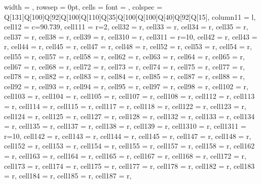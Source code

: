 \begin{longtblr}[
  caption = {Linear model estimating all the considered metrics in every alternative scenario.},
  label = {tab:appendix_LCBM_all_metrics_all_scenarios}
]{
  width = \linewidth,
  rowsep = 0pt,
  cells   = {font = \fontsize{6}{5}\selectfont},
  colspec = {Q[131]Q[100]Q[92]Q[100]Q[110]Q[35]Q[100]Q[100]Q[40]Q[92]Q[15]},
  column{11} = {l},
  cell{1}{2} = {c=9}{0.739\linewidth},
  cell{1}{11} = {r=2}{},
  cell{3}{2} = {r},
  cell{3}{3} = {r},
  cell{3}{4} = {r},
  cell{3}{5} = {r},
  cell{3}{7} = {r},
  cell{3}{8} = {r},
  cell{3}{9} = {r},
  cell{3}{10} = {r},
  cell{3}{11} = {r=10}{},
  cell{4}{2} = {r},
  cell{4}{3} = {r},
  cell{4}{4} = {r},
  cell{4}{5} = {r},
  cell{4}{7} = {r},
  cell{4}{8} = {r},
  cell{5}{2} = {r},
  cell{5}{3} = {r},
  cell{5}{4} = {r},
  cell{5}{5} = {r},
  cell{5}{7} = {r},
  cell{5}{8} = {r},
  cell{6}{2} = {r},
  cell{6}{3} = {r},
  cell{6}{4} = {r},
  cell{6}{5} = {r},
  cell{6}{7} = {r},
  cell{6}{8} = {r},
  cell{7}{2} = {r},
  cell{7}{3} = {r},
  cell{7}{4} = {r},
  cell{7}{5} = {r},
  cell{7}{7} = {r},
  cell{7}{8} = {r},
  cell{8}{2} = {r},
  cell{8}{3} = {r},
  cell{8}{4} = {r},
  cell{8}{5} = {r},
  cell{8}{7} = {r},
  cell{8}{8} = {r},
  cell{9}{2} = {r},
  cell{9}{3} = {r},
  cell{9}{4} = {r},
  cell{9}{5} = {r},
  cell{9}{7} = {r},
  cell{9}{8} = {r},
  cell{10}{2} = {r},
  cell{10}{3} = {r},
  cell{10}{4} = {r},
  cell{10}{5} = {r},
  cell{10}{7} = {r},
  cell{10}{8} = {r},
  cell{11}{2} = {r},
  cell{11}{3} = {r},
  cell{11}{4} = {r},
  cell{11}{5} = {r},
  cell{11}{7} = {r},
  cell{11}{8} = {r},
  cell{12}{2} = {r},
  cell{12}{3} = {r},
  cell{12}{4} = {r},
  cell{12}{5} = {r},
  cell{12}{7} = {r},
  cell{12}{8} = {r},
  cell{13}{2} = {r},
  cell{13}{3} = {r},
  cell{13}{4} = {r},
  cell{13}{5} = {r},
  cell{13}{7} = {r},
  cell{13}{8} = {r},
  cell{13}{9} = {r},
  cell{13}{10} = {r},
  cell{13}{11} = {r=10}{},
  cell{14}{2} = {r},
  cell{14}{3} = {r},
  cell{14}{4} = {r},
  cell{14}{5} = {r},
  cell{14}{7} = {r},
  cell{14}{8} = {r},
  cell{15}{2} = {r},
  cell{15}{3} = {r},
  cell{15}{4} = {r},
  cell{15}{5} = {r},
  cell{15}{7} = {r},
  cell{15}{8} = {r},
  cell{16}{2} = {r},
  cell{16}{3} = {r},
  cell{16}{4} = {r},
  cell{16}{5} = {r},
  cell{16}{7} = {r},
  cell{16}{8} = {r},
  cell{17}{2} = {r},
  cell{17}{3} = {r},
  cell{17}{4} = {r},
  cell{17}{5} = {r},
  cell{17}{7} = {r},
  cell{17}{8} = {r},
  cell{18}{2} = {r},
  cell{18}{3} = {r},
  cell{18}{4} = {r},
  cell{18}{5} = {r},
  cell{18}{7} = {r},
}
\end{longtblr}
